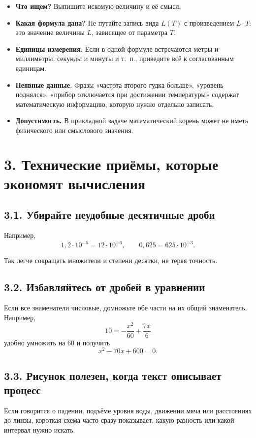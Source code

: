 \documentclass[a4paper,12pt]{article}
\newcommand{\sectionline}{\par\vspace{0.3em}{\color{accent}\hrule height 0.7pt}\vspace{0.7em}}
\newcommand{\key}[1]{\textbf{\color{darkaccent}#1}}
\begin{document}
\begin{itemize}
  \item \key{Что ищем?} Выпишите искомую величину и её смысл.
  \item \key{Какая формула дана?} Не путайте запись вида $L(T)$ с произведением $L\cdot T$: это значение величины $L$, зависящее от параметра $T$.
  \item \key{Единицы измерения.} Если в одной формуле встречаются метры и миллиметры, секунды и минуты и т.~п., приведите всё к согласованным единицам.
  \item \key{Неявные данные.} Фразы «частота второго гудка больше», «уровень поднялся», «прибор отключается при достижении температуры» содержат математическую информацию, которую нужно отдельно записать.
  \item \key{Допустимость.} В прикладной задаче математический корень может не иметь физического или смыслового значения.
\end{itemize}

\section*{3. Технические приёмы, которые экономят вычисления}
\sectionline

\subsection*{3.1. Убирайте неудобные десятичные дроби}

Например,
\[
1{,}2\cdot10^{-5}=12\cdot10^{-6},
\qquad
0{,}625=625\cdot10^{-3}.
\]

Так легче сокращать множители и степени десятки, не теряя точность.

\subsection*{3.2. Избавляйтесь от дробей в уравнении}

Если все знаменатели числовые, домножьте обе части на их общий знаменатель. Например,
\[
10=-\frac{x^2}{60}+\frac{7x}{6}
\]
удобно умножить на $60$ и получить
\[
x^2-70x+600=0.
\]

\subsection*{3.3. Рисунок полезен, когда текст описывает процесс}

Если говорится о падении, подъёме уровня воды, движении мяча или расстояниях до линзы, короткая схема часто сразу показывает, какую разность или какой интервал нужно искать.
\end{document}
